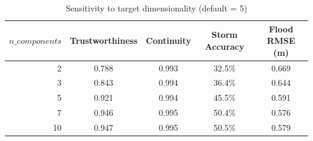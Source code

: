 \begin{table}[H]
\centering
\begin{tabular}{rcccc}
    \toprule
    $n\_components$ & Trustworthiness & Continuity & Storm Accuracy & Flood RMSE (m) \\
    \midrule
    2 & 0.788 & 0.993 & 32.5\% & 0.669 \\
    3 & 0.843 & 0.994 & 36.4\% & 0.644 \\
    5 & 0.921 & 0.994 & 45.5\% & 0.591 \\
    7 & 0.946 & 0.995 & 50.4\% & 0.576 \\
    10 & 0.947 & 0.995 & 50.5\% & 0.579 \\
    \bottomrule
\end{tabular}
\caption{Sensitivity to target dimensionality (default = 5)}
\label{tab:sens_components}
\end{table}